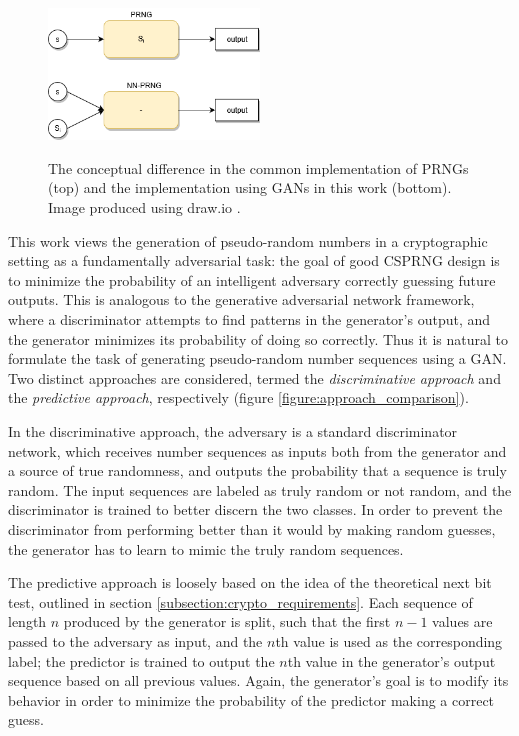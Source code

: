 \documentclass[12pt, titlepage]{report}
\theoremstyle{definition}
\begin{document}
\begin{figure}
\centering
\includegraphics[width=0.5\textwidth]{img/conceptual_design.png}\\
\caption{The conceptual difference in the common implementation of PRNGs (top) and the implementation using GANs in this work (bottom). Image produced using draw.io \cite{jgraph2018draw}.}
\label{figure:conceptual_difference}
\end{figure}

This work views the generation of pseudo-random numbers in a cryptographic setting as a fundamentally adversarial task: the goal of good CSPRNG design is to minimize the probability of an intelligent adversary correctly guessing future outputs. This is analogous to the generative adversarial network framework, where a discriminator attempts to find patterns in the generator's output, and the generator minimizes its probability of doing so correctly. Thus it is natural to formulate the task of generating pseudo-random number sequences using a GAN. Two distinct approaches are considered, termed the \textit{discriminative approach} and the \textit{predictive approach}, respectively (figure \ref{figure:approach_comparison}). 

In the discriminative approach, the adversary is a standard discriminator network, which receives number sequences as inputs both from the generator and a source of true randomness, and outputs the probability that a sequence is truly random. The input sequences are labeled as truly random or not random, and the discriminator is trained to better discern the two classes. In order to prevent the discriminator from performing better than it would by making random guesses, the generator has to learn to mimic the truly random sequences.

The predictive approach is loosely based on the idea of the theoretical next bit test, outlined in section \ref{subsection:crypto_requirements}. Each sequence of length $n$ produced by the generator is split, such that the first $n - 1$ values are passed to the adversary as input, and the $n$th value is used as the corresponding label; the predictor is trained to output the $n$th value in the generator's output sequence based on all previous values. Again, the generator's goal is to modify its behavior in order to minimize the probability of the predictor making a correct guess.
\end{document}
